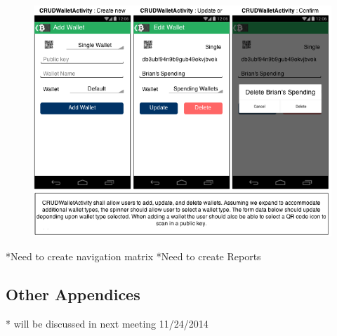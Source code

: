   \begin{figure}[H]
     \includegraphics[width=1.0\textwidth]{../diagrams/storyboard_CRUDwallet.png}
  \end{figure}
  
	*Need to create navigation matrix
	*Need to create Reports
	
  \subsection{Other Appendices}
  * will be discussed in next meeting 11/24/2014
